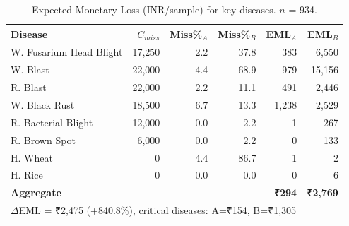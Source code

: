 \begin{table}[t]
\centering
\caption{Expected Monetary Loss (INR/sample) for key diseases. $n$ = 934.}
\label{tab:eml}
\begin{tabular}{lrrrrr}
\toprule
Disease & $C_{miss}$ & Miss\%$_A$ & Miss\%$_B$ & EML$_A$ & EML$_B$ \\
\midrule
W. Fusarium Head Blight & 17,250 & 2.2 & 37.8 & 383 & 6,550 \\
W. Blast & 22,000 & 4.4 & 68.9 & 979 & 15,156 \\
R. Blast & 22,000 & 2.2 & 11.1 & 491 & 2,446 \\
W. Black Rust & 18,500 & 6.7 & 13.3 & 1,238 & 2,529 \\
R. Bacterial Blight & 12,000 & 0.0 & 2.2 & 1 & 267 \\
R. Brown Spot & 6,000 & 0.0 & 2.2 & 0 & 133 \\
H. Wheat & 0 & 4.4 & 86.7 & 1 & 2 \\
H. Rice & 0 & 0.0 & 0.0 & 0 & 6 \\
\midrule
\textbf{Aggregate} & & & & \textbf{\textrm{₹}294} & \textbf{\textrm{₹}2,769} \\
\midrule
\multicolumn{6}{l}{$\Delta$EML = \textrm{₹}2,475 (+840.8\%), critical diseases: A=\textrm{₹}154, B=\textrm{₹}1,305} \\
\bottomrule
\end{tabular}
\end{table}
